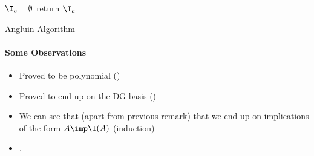 \begin{algorithm}
\KwIn{$\I$}

\BlankLine
\BlankLine

$\I_c = \emptyset$ \;
return $\I_c$ \;
	
\caption{Angluin Algorithm}
\label{alg:Angluin}
\end{algorithm}

\paragraph{Some Observations} \begin{itemize}
	\item Proved to be polynomial (\cite{angluin_learning_1992})
	\item Proved to end up on the DG basis (\cite{arias_canonical_2009})
	\item We can see that (apart from previous remark) that we end up 
	on implications of the form $A \imp \I(A)$ (induction)
	\item .
\end{itemize}



